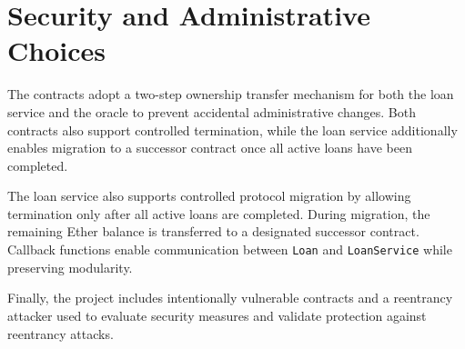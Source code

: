 \section{Security and Administrative Choices}

The contracts adopt a two-step ownership transfer mechanism for both the loan service and the oracle to prevent accidental administrative changes. Both contracts also support controlled termination, while the loan service additionally enables migration to a successor contract once all active loans have been completed.

The loan service also supports controlled protocol migration by allowing termination only after all active loans are completed. During migration, the remaining Ether balance is transferred to a designated successor contract. Callback functions enable communication between \texttt{Loan} and \texttt{LoanService} while preserving modularity.

Finally, the project includes intentionally vulnerable contracts and a reentrancy attacker used to evaluate security measures and validate protection against reentrancy attacks.

